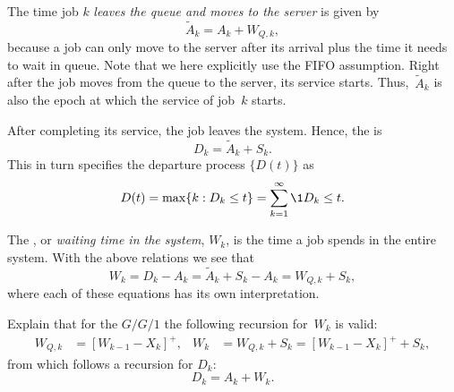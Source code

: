 The time job $k$ \emph{leaves the queue and moves to the server} is given by
\begin{equation*}
 \tilde A_k = A_k + W_{Q,k},
\end{equation*}
because a job can only move to the server after its arrival plus the time it needs to wait in queue.
Note that we here explicitly use the FIFO assumption.
Right after the job moves from the queue to the server, its service starts.
Thus,~$\tilde A_{k}$ is also the epoch at which the service of job~$k$ starts.

After completing its service, the job leaves the system.
Hence, the  is
\begin{equation*}
 D_k = \tilde A_{k} + S_k.
\end{equation*}
This in turn specifies the departure process $\{D(t)\}$ as
\begin{equation*}
 D(t) = \max\{k : D_k \leq t\} = \sum_{k=1}^\infty \1{D_k \leq t}.
\end{equation*}



The , or \emph{waiting time in the system}, $W_k$, is the time a job spends in the entire system.
With the above relations we see that
\begin{equation}
 W_k = D_k - A_k = \tilde A_{k} + S_k -A_k = W_{Q,k} + S_k,
\end{equation}
where each of these equations has its own interpretation. 


\begin{extra}
 Explain that for the $G/G/1$ the following recursion for~$W_k$ is valid:
\begin{align}
 \label{eq:59}
 W_{Q,k} &= [W_{k-1} - X_k]^+, &
 W_{k} &= W_{Q,k} + S_k = [W_{k-1} - X_k]^+ + S_k,
\end{align}
from which follows a recursion for $D_k$:
\begin{equation}
 D_k = A_k + W_k.
\end{equation}
\end{extra}

